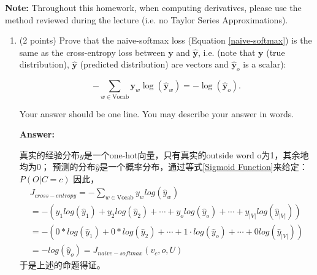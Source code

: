 \documentclass{article}
\newenvironment{answer}{
    {\bf Answer:} \sf \begingroup\color{red}
}{\endgroup}%
\begin{document}
\textbf{Note:} Throughout this homework, when computing derivatives, please use the method reviewed during the lecture (i.e. no Taylor Series Approximations).

\clearpage 
\begin{enumerate}[label=(\alph*)]
\item (2 points) 
Prove that the naive-softmax loss (Equation \ref{naive-softmax}) is the same as the cross-entropy loss between $\bm y$  and $\hat{\bm y}$, i.e. (note that $\bm y$ 
 (true distribution), $\hat{\bm y}$ (predicted distribution) are vectors and $\hat{\bm y}_o$ is a scalar):

\begin{equation} 
-\sum_{w \in \text{Vocab}} \bm y_w \log(\hat{\bm y}_w) = - \log (\hat{\bm y}_o).
\end{equation}

Your answer should be one line. You may describe your answer in words.
\begin{shaded}
\begin{answer}
真实的经验分布$y$是一个one-hot向量，只有真实的outside word o为1，其余地均为0；
预测的分布$\hat{y}$是一个概率分布，通过等式\ref{Sigmoid Function}来给定：$P(O|C=c)$
因此，
\begin{equation}
\begin{array}{l}
		J_{cross-entropy}=-\sum_{w\in \text{Vocab}}y_w log(\hat{y}_w) \\= -(y_1 log(\hat{y}_1)+y_2 log(\hat{y}_2) + \cdots + y_o log(\hat{y}_o)+\cdots + y_{|V|}log(\hat{y}_{|V|})) \\
		= -(0*log(\hat{y}_1)+0*log(\hat{y}_2)+\cdots + 1\cdot log(\hat{y}_o)+\cdots+0log(\hat{y}_{|V|}))\\
		= -log(\hat{y}_o) = J_{naive-softmax}(v_c,o,U)
\end{array}
\end{equation}
于是上述的命题得证。
\end{answer}
\end{shaded}


\end{enumerate}
\end{document}

